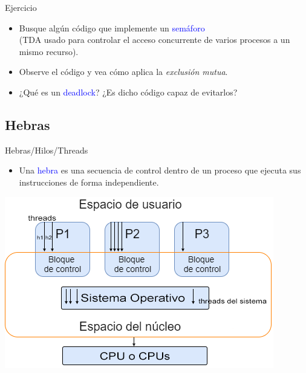 \documentclass[handout]{beamer} %
\newcommand{\blue}[1]{\textcolor{blue}{#1}}
\begin{document}
\begin{frame}{Ejercicio}
    \begin{itemize}
        \item Busque algún código que implemente un \blue{semáforo}\\(TDA usado para controlar el acceso concurrente de varios procesos a un mismo recurso).
        \item Observe el código y vea cómo aplica la {\em exclusión mutua}.
        \item ¿Qué es un \blue{deadlock}? ¿Es dicho código capaz de evitarlos?
    \end{itemize}
\end{frame}

\subsection{Hebras}

\begin{frame}{Hebras/Hilos/Threads}
    \begin{itemize}
        \item Una \blue{hebra} es una secuencia de control dentro de un proceso que ejecuta sus instrucciones de forma independiente.
    \end{itemize}
    \begin{center}
        \includegraphics[width=.8\textwidth]{./image/cap7/espacios-hebras.png}
    \end{center}
\end{frame}
\end{document}
